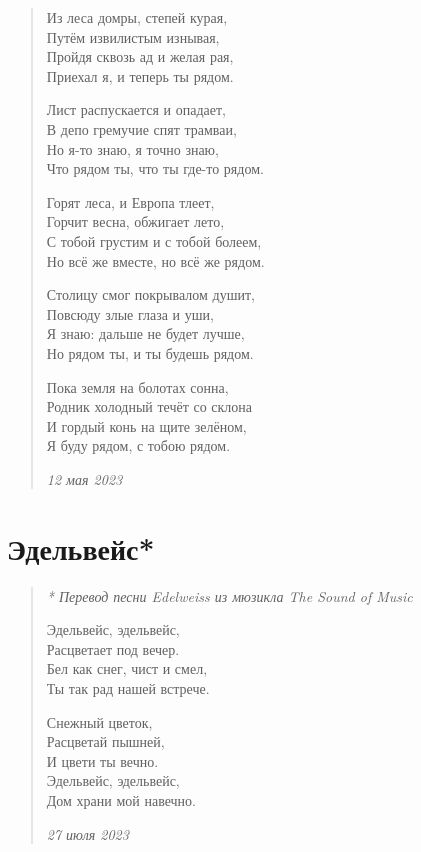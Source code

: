 \begin{verse}

Из леса домры, степей курая,\\
Путём извилистым изнывая,\\
Пройдя сквозь ад и желая рая,\\
Приехал я, и теперь ты рядом.

Лист распускается и опадает,\\
В депо гремучие спят трамваи,\\
Но я-то знаю, я точно знаю,\\
Что рядом ты, что ты где-то рядом.

Горят леса, и Европа тлеет,\\
Горчит весна, обжигает лето,\\
С тобой грустим и с тобой болеем,\\
Но всё же вместе, но всё же рядом.

Столицу смог покрывалом душит,\\
Повсюду злые глаза и уши,\\
Я знаю: дальше не будет лучше,\\
Но рядом ты, и ты будешь рядом.

Пока земля на болотах сонна,\\
Родник холодный течёт со склона\\
И гордый конь на щите зелёном,\\
Я буду рядом, с тобою рядом.

\emph{12 мая 2023}

\end{verse}

\newpage
\section{Эдельвейс*}

\begin{verse}
\emph{* Перевод песни \textit{Edelweiss} из мюзикла \textit{The Sound of Music}}

Эдельвейс, эдельвейс,\\
Расцветает под вечер.\\
Бел как снег, чист и смел,\\
Ты так рад нашей встрече.

Снежный цветок,\\
Расцветай пышней,\\
И цвети ты вечно.\\
Эдельвейс, эдельвейс,\\
Дом храни мой навечно.

\emph{27 июля 2023}

\end{verse}

